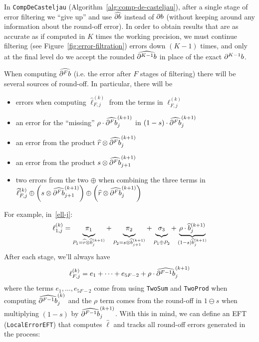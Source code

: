 \documentclass[3p, authoryear, square]{elsarticle}
\theoremstyle{definition}
\newcommand{\db}[1]{
  \ifthenelse{\equal{#1}{1}}
             {\partial b}
             {\partial^{#1} b}
}
\newcommand{\cdb}[1]{
  \ifthenelse{\equal{#1}{1}}
             {\widehat{\partial b}}
             {\widehat{\partial^{#1} b}}
}
\begin{document}
In \texttt{CompDeCasteljau} (Algorithm~\ref{alg:comp-de-casteljau}), after
a single stage of error filtering we
``give up'' and use \(\cdb{1}\) instead of
\(\db{1}\) (without keeping around any information about the
round-off error). In order to obtain results that are as accurate as if
computed in \(K\) times the working precision, we must continue filtering
(see Figure~\ref{fig:error-filtration})
errors down \((K - 1)\) times, and only at the final level do we accept
the rounded
\(\cdb{K - 1}\) in place of the exact
\(\db{K - 1}\).

When computing \(\cdb{F}\) (i.e. the error after
\(F\) stages of filtering)
there will be several sources of round-off. In particular, there will be
\begin{itemize}
\item errors when computing \(\widehat{\ell}_{F, j}^{(k)}\) from the
  terms in \(\ell_{F, j}^{(k)}\)
\item an error
for the ``missing'' \(\rho \cdot \cdb{F}_j^{(k + 1)}\) in
\((1 - s) \cdot \cdb{F}_j^{(k + 1)}\)
\item an error from the product
  \(\widehat{r} \otimes \cdb{F}_j^{(k + 1)}\)
\item an error from the product
  \(s \otimes \cdb{F}_{j + 1}^{(k + 1)}\)
\item two errors from the two \(\oplus\) when combining the three
  terms in
  \(\widehat{\ell}_{F, j}^{(k)} \oplus
  \left(s \otimes \cdb{F}_{j + 1}^{(k + 1)}\right) \oplus
  \left(\widehat{r} \otimes \cdb{F}_j^{(k + 1)}\right)\)
\end{itemize}
For example, in~\eqref{ell-j}:
\begin{equation}
\ell_{1, j}^{(k)} =
    \underbrace{\vphantom{\rho \cdot \widehat{b}_j^{(k + 1)}} \pi_1}_{
        \vphantom{(1 - s) \widehat{b}_j^{(k + 1)}}
        P_1 = \widehat{r} \otimes \widehat{b}_j^{(k + 1)}} +
    \underbrace{\vphantom{\rho \cdot \widehat{b}_j^{(k + 1)}} \pi_2}_{
        \vphantom{(1 - s) \widehat{b}_j^{(k + 1)}}
        P_2 = s \otimes \widehat{b}_{j + 1}^{(k + 1)}} +
    \underbrace{\vphantom{\rho \cdot \widehat{b}_j^{(k + 1)}} \sigma_3}_{
        \vphantom{(1 - s) \widehat{b}_j^{(k + 1)}}
        P_1 \oplus P_2} +
    \underbrace{\rho \cdot \widehat{b}_j^{(k + 1)}}_{
        (1 - s) \widehat{b}_j^{(k + 1)}}
\end{equation}
After each stage, we'll always have
\begin{equation}
\ell_{F, j}^{(k)} = e_1 + \cdots + e_{5F - 2} + \rho \cdot
\cdb{F - 1}_j^{(k + 1)}
\end{equation}
where the terms \(e_1, \ldots, e_{5F - 2}\) come from using \texttt{TwoSum}
and \texttt{TwoProd} when computing \(\cdb{F - 1}_j^{(k)}\)
and the \(\rho\) term comes from the round-off
in \(1 \ominus s\) when multiplying \((1 - s)\) by
\(\cdb{F - 1}_j^{(k + 1)}\). With this in mind, we
can define an EFT (\texttt{LocalErrorEFT}) that computes
\(\widehat{\ell}\) and tracks all round-off errors generated in
the process:
\end{document}
